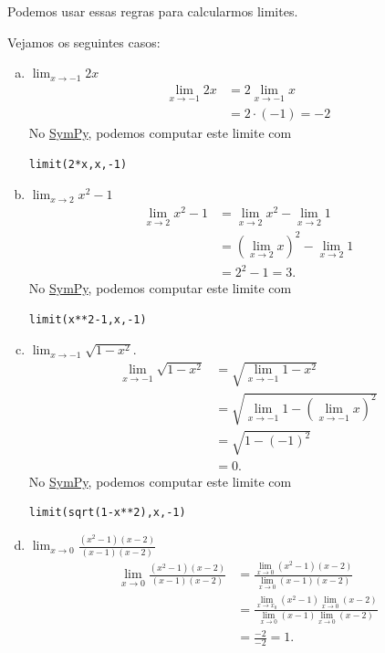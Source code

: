 Podemos usar essas regras para calcularmos limites.

\begin{ex}
  Vejamos os seguintes casos:
  \begin{enumerate}[a)]
  \item $\displaystyle \lim_{x\to -1} 2x$
  \begin{align}
    \lim_{x\to -1} 2x &= 2\lim_{x\to -1} x\\
    &= 2\cdot(-1) = -2
  \end{align}
  \ifispython
  No \href{https://www.sympy.org}{SymPy}, podemos computar este limite com
\begin{verbatim}
limit(2*x,x,-1)
\end{verbatim}
  \fi
\item $\displaystyle \lim_{x\to 2} x^2 - 1$
  \begin{align}
    \lim_{x\to 2} x^2 - 1 &= \lim_{x\to 2} x^2 - \lim_{x\to 2} 1\\
                          &= \left(\lim_{x\to 2} x\right)^2 - \lim_{x\to 2} 1\\
    &= 2^2 - 1 = 3.
  \end{align}
  \ifispython
  No \href{https://www.sympy.org}{SymPy}, podemos computar este limite com
\begin{verbatim}
limit(x**2-1,x,-1)
\end{verbatim}
  \fi
\item $\displaystyle \lim_{x\to -1} \sqrt{1-x^2}$.
  \begin{align}
    \lim_{x\to -1} \sqrt{1-x^2} &= \sqrt{\lim_{x\to -1} 1-x^2}\\
                                &= \sqrt{\lim_{x\to -1} 1 - \left(\lim_{x\to -1} x\right)^2}\\
                                &= \sqrt{1 - (-1)^2} \\
                                &= 0.
  \end{align}
  \ifispython
  No \href{https://www.sympy.org}{SymPy}, podemos computar este limite com
\begin{verbatim}
limit(sqrt(1-x**2),x,-1)
\end{verbatim}
  \fi  
\item $\displaystyle \lim_{x\to 0} \frac{(x^2-1)(x-2)}{(x-1)(x-2)}$
  \begin{align}
    \lim_{x\to 0} \frac{(x^2-1)(x-2)}{(x-1)(x-2)} &= \frac{\lim_{x\to 0}(x^2-1)(x-2)}{\lim_{x\to 0} (x-1)(x-2)}\\
                                                  &= \frac{\lim_{x\to x_0} (x^2-1)\lim_{x\to 0}(x-2)}{\lim_{x\to 0}(x-1)\lim_{x\to 0}(x-2)}\\
    &= \frac{-2}{-2} = 1.
  \end{align}
  \end{enumerate}
\end{ex}


